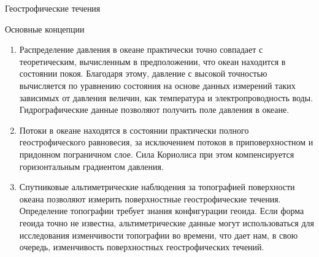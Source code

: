 \begin{chapter}{Геострофические течения}
\begin{section}{Основные концепции}
\begin{enumerate}
\item
Распределение давления в океане практически точно совпадает с теоретическим,
вычисленным в предположении, что океан находится в состоянии покоя. Благодаря
этому, давление с высокой точностью вычисляется по уравнению состояния 
на основе данных измерений таких зависимых от давления величин, как температура 
и электропроводность воды. Гидрографические 
данные позволяют получить 
поле давления в океане.
%

\item
Потоки в океане находятся в состоянии практически полного геострофического 
равновесия, за исключением потоков в 
приповерхностном и придонном пограничном слое. Сила Кориолиса при этом
компенсируется горизонтальным градиентом давления.
%

\item
Спутниковые альтиметрические наблюдения за топографией поверхности океана 
позволяют измерить поверхностные геострофические 
течения. Определение
топографии требует знания конфигурации геоида. 
Если форма геоида точно не известна, альтиметрические данные могут 
использоваться для исследования изменчивости топографии во времени,
что дает нам, в свою очередь, изменчивость поверхностных геострофических 
течений.
%


\end{enumerate}
\end{section}
\end{chapter}
